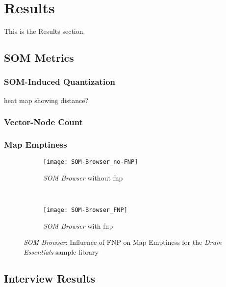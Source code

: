 
\section{Results}
\label{sec:results}
This is the Results section.

\subsection{SOM Metrics}
\label{subsec:results_som_metrics}

\subsubsection{SOM-Induced Quantization}
\label{subsubsec:results_som_quantization}

heat map showing distance?

\subsubsection{Vector-Node Count}
\label{subsubsec:results_vector_node_count}

\subsubsection{Map Emptiness}
\label{subsubsec:results_map_emptiness}

\begin{figure}[!htb]
  \centering
\begin{subfigure}{0.45\textwidth}
  \centering
  \texttt{[image: SOM-Browser\_no-FNP]}
  \caption{\textit{SOM Browser} without \gls{fnp}}
  \label{fig:results_no_fnp}
\end{subfigure}
~
\begin{subfigure}{0.45\textwidth}
  \centering
  \texttt{[image: SOM-Browser\_FNP]}
  \caption{\textit{SOM Browser} with \gls{fnp}}
  \label{fig:results_fnp}
\end{subfigure}
\caption[\textit{SOM Browser}: Influence of FNP on Map Emptiness]
{\textit{SOM Browser}: Influence of FNP on Map Emptiness for the
\textit{Drum Essentials} sample library}
\label{fig:results_fnp_comparison}
\end{figure}


\subsection{Interview Results}
\label{subsec:results_interview}

